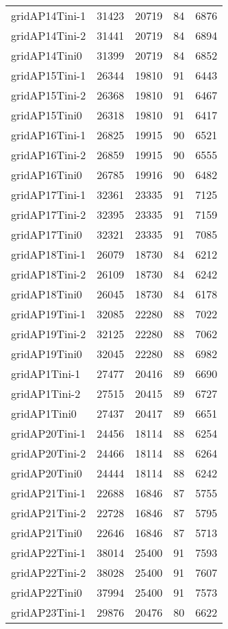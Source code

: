 \begin{tabular}{lrrrr}
gridAP14Tini-1 & 31423 & 20719 & 84 & 6876 \\
gridAP14Tini-2 & 31441 & 20719 & 84 & 6894 \\
gridAP14Tini0 & 31399 & 20719 & 84 & 6852 \\
gridAP15Tini-1 & 26344 & 19810 & 91 & 6443 \\
gridAP15Tini-2 & 26368 & 19810 & 91 & 6467 \\
gridAP15Tini0 & 26318 & 19810 & 91 & 6417 \\
gridAP16Tini-1 & 26825 & 19915 & 90 & 6521 \\
gridAP16Tini-2 & 26859 & 19915 & 90 & 6555 \\
gridAP16Tini0 & 26785 & 19916 & 90 & 6482 \\
gridAP17Tini-1 & 32361 & 23335 & 91 & 7125 \\
gridAP17Tini-2 & 32395 & 23335 & 91 & 7159 \\
gridAP17Tini0 & 32321 & 23335 & 91 & 7085 \\
gridAP18Tini-1 & 26079 & 18730 & 84 & 6212 \\
gridAP18Tini-2 & 26109 & 18730 & 84 & 6242 \\
gridAP18Tini0 & 26045 & 18730 & 84 & 6178 \\
gridAP19Tini-1 & 32085 & 22280 & 88 & 7022 \\
gridAP19Tini-2 & 32125 & 22280 & 88 & 7062 \\
gridAP19Tini0 & 32045 & 22280 & 88 & 6982 \\
gridAP1Tini-1 & 27477 & 20416 & 89 & 6690 \\
gridAP1Tini-2 & 27515 & 20415 & 89 & 6727 \\
gridAP1Tini0 & 27437 & 20417 & 89 & 6651 \\
gridAP20Tini-1 & 24456 & 18114 & 88 & 6254 \\
gridAP20Tini-2 & 24466 & 18114 & 88 & 6264 \\
gridAP20Tini0 & 24444 & 18114 & 88 & 6242 \\
gridAP21Tini-1 & 22688 & 16846 & 87 & 5755 \\
gridAP21Tini-2 & 22728 & 16846 & 87 & 5795 \\
gridAP21Tini0 & 22646 & 16846 & 87 & 5713 \\
gridAP22Tini-1 & 38014 & 25400 & 91 & 7593 \\
gridAP22Tini-2 & 38028 & 25400 & 91 & 7607 \\
gridAP22Tini0 & 37994 & 25400 & 91 & 7573 \\
gridAP23Tini-1 & 29876 & 20476 & 80 & 6622 \\

\end{tabular}
